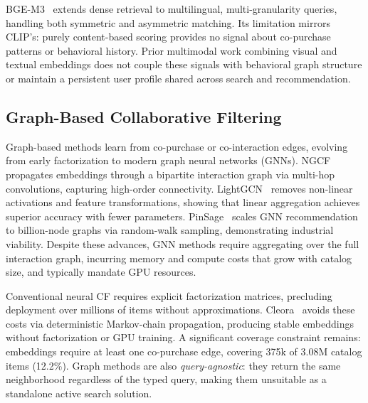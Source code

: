 BGE-M3~\cite{chen2024bgem3} extends dense retrieval to multilingual,
multi-granularity queries, handling both symmetric and asymmetric matching.
Its limitation mirrors CLIP's: purely content-based scoring provides no signal
about co-purchase patterns or behavioral history.
Prior multimodal work combining visual and textual embeddings does not couple
these signals with behavioral graph structure or maintain a persistent user
profile shared across search and recommendation.

\subsection{Graph-Based Collaborative Filtering}
Graph-based methods learn from co-purchase or co-interaction edges, evolving
from early factorization to modern graph neural networks (GNNs).
NGCF~\cite{wang2019ngcf} propagates embeddings through a bipartite interaction
graph via multi-hop convolutions, capturing high-order connectivity.
LightGCN~\cite{he2020lightgcn} removes non-linear activations and feature
transformations, showing that linear aggregation achieves superior accuracy
with fewer parameters.
PinSage~\cite{ying2018pinsage} scales GNN recommendation to billion-node
graphs via random-walk sampling, demonstrating industrial viability.
Despite these advances, GNN methods require aggregating over the full
interaction graph, incurring memory and compute costs that grow with catalog
size, and typically mandate GPU resources.

Conventional neural CF requires explicit factorization matrices, precluding
deployment over millions of items without approximations.
Cleora~\cite{cleora2021} avoids these costs via deterministic Markov-chain
propagation, producing stable embeddings without factorization or GPU training.
A significant coverage constraint remains: embeddings require at least one
co-purchase edge, covering 375k of 3.08M catalog items (12.2\%).
Graph methods are also \emph{query-agnostic}: they return the same
neighborhood regardless of the typed query, making them unsuitable as a
standalone active search solution.

